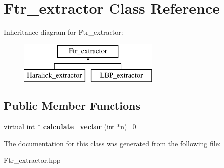 \hypertarget{class_ftr__extractor}{\section{Ftr\+\_\+extractor Class Reference}
\label{class_ftr__extractor}
}
Inheritance diagram for Ftr\+\_\+extractor\+:\begin{figure}[H]
\begin{center}
\leavevmode
\includegraphics[height=2.000000cm]{class_ftr__extractor}
\end{center}
\end{figure}
\subsection*{Public Member Functions}
\begin{DoxyCompactItemize}
\item 
\hypertarget{class_ftr__extractor_ad7cc765a1f09452f5257bfe84ec5f9b0}{virtual int $\ast$ {\bfseries calculate\+\_\+vector} (int $\ast$n)=0}\label{class_ftr__extractor_ad7cc765a1f09452f5257bfe84ec5f9b0}

\end{DoxyCompactItemize}


The documentation for this class was generated from the following file\+:\begin{DoxyCompactItemize}
\item 
Ftr\+\_\+extractor.\+hpp\end{DoxyCompactItemize}
